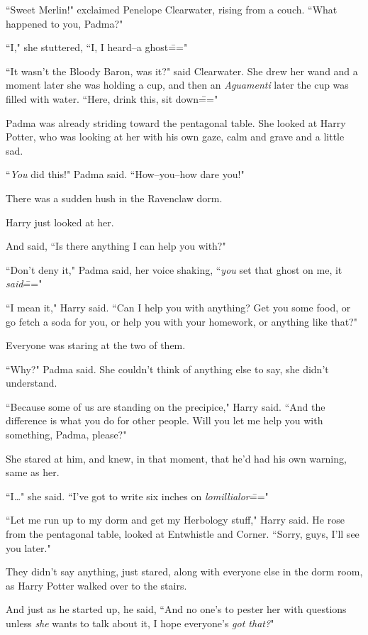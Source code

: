 ``Sweet Merlin!" exclaimed Penelope Clearwater, rising from a couch. ``What happened to you, Padma?"

``I," she stuttered, ``I, I heard\---a ghost\==="

``It wasn't the Bloody Baron, was it?" said Clearwater. She drew her wand and a moment later she was holding a cup, and then an \emph{Aguamenti} later the cup was filled with water. ``Here, drink this, sit down\==="

Padma was already striding toward the pentagonal table. She looked at Harry Potter, who was looking at her with his own gaze, calm and grave and a little sad.

``\emph{You} did this!" Padma said. ``How\---you\---how dare you!"

There was a sudden hush in the Ravenclaw dorm.

Harry just looked at her.

And said, ``Is there anything I can help you with?"

``Don't deny it," Padma said, her voice shaking, ``\emph{you} set that ghost on me, it \emph{said}\==="

``I mean it," Harry said. ``Can I help you with anything? Get you some food, or go fetch a soda for you, or help you with your homework, or anything like that?"

Everyone was staring at the two of them.

``Why?" Padma said. She couldn't think of anything else to say, she didn't understand.

``Because some of us are standing on the precipice," Harry said. ``And the difference is what you do for other people. Will you let me help you with something, Padma, please?"

She stared at him, and knew, in that moment, that he'd had his own warning, same as her.

``I{\ldots}" she said. ``I've got to write six inches on \emph{lomillialor}\==="

``Let me run up to my dorm and get my Herbology stuff," Harry said. He rose from the pentagonal table, looked at Entwhistle and Corner. ``Sorry, guys, I'll see you later."

They didn't say anything, just stared, along with everyone else in the dorm room, as Harry Potter walked over to the stairs.

And just as he started up, he said, ``And no one's to pester her with questions unless \emph{she} wants to talk about it, I hope everyone's \emph{got that?}"

